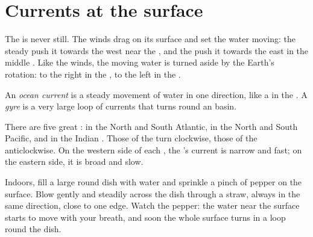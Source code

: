 \section{Currents at the surface}

The  is never still. The winds drag on its surface and set the water
moving: the steady  push it towards the west near the
, and the  push it towards the east in the middle
. Like the winds, the moving water is turned aside by the
Earth's rotation: to the right in the , to the left in
the .

\begin{definition}\label{def:g8:the-oceans:current}
An \emph{ocean current} is a steady movement of 
water in one direction, like a  in the . A
\emph{gyre} is a very large loop of  currents that turns
round an  basin.
\end{definition}
\label{def:g8:the-oceans:gyre}

There are five great : in the North and South Atlantic, in the North
and South Pacific, and in the Indian . Those of the  turn clockwise, those of the  anticlockwise.
On the western side of each , the 's current is narrow and fast;
on the eastern side, it is broad and slow.

\begin{inthelab}
Indoors, fill a large round dish with water and sprinkle a pinch of pepper
on the surface. Blow gently and steadily across the dish through a straw,
always in the same direction, close to one edge. Watch the pepper: the
water near the surface starts to move with your breath, and soon the
whole surface turns in a loop round the dish.
\end{inthelab}

